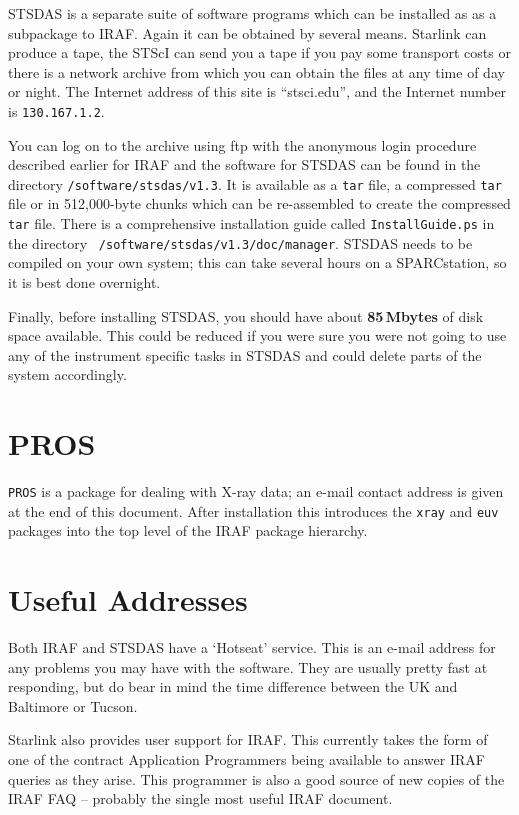 STSDAS is a separate suite of software programs which can be installed
as as a subpackage to IRAF. Again it can be obtained by several
means. Starlink can produce a tape, the STScI
can send you a tape if you pay some transport costs or
there is a network archive from which you can obtain the files at any
time of day or night. The Internet address of this site is
``stsci.edu'', and the Internet number is {\tt 130.167.1.2}. 

You can
log on to the archive using ftp with the anonymous login procedure
described earlier for IRAF and the software for STSDAS can be found in
the directory {\tt /software/stsdas/v1.3}. It is available as a {\tt tar}
file, a compressed {\tt tar} file or in 512,000-byte chunks which can be
re-assembled to create the compressed {\tt tar} file. There is a comprehensive
installation guide called {\tt InstallGuide.ps} in the directory {\tt
/software/stsdas/v1.3/doc/manager}. STSDAS needs to be compiled on
your own system; this can take several hours on a SPARCstation, so it
is best done overnight.

Finally, before installing STSDAS, you should have about {\bf
85\,Mbytes} of disk space available.
This could be reduced if you were sure you were
not going to use any of the instrument specific tasks in STSDAS and
could delete parts of the system accordingly.

\section{PROS}

{\tt PROS} is a package for dealing with X-ray data; an e-mail contact
address is given at the end of this document. After installation this
introduces the {\tt xray} and {\tt euv} packages into the top level of the
IRAF package hierarchy.

\section{Useful Addresses}

Both IRAF and STSDAS have a `Hotseat' service. This is an e-mail
address for any problems you may have with the software. They are
usually pretty fast at responding, but do bear in mind the time
difference between the UK and Baltimore or Tucson.

Starlink also provides user support for IRAF. This currently 
takes the form of one of the contract Application Programmers being 
available to answer IRAF queries as they arise. This
programmer is also a good
source of new copies of the IRAF FAQ -- probably the single most useful 
IRAF document.

